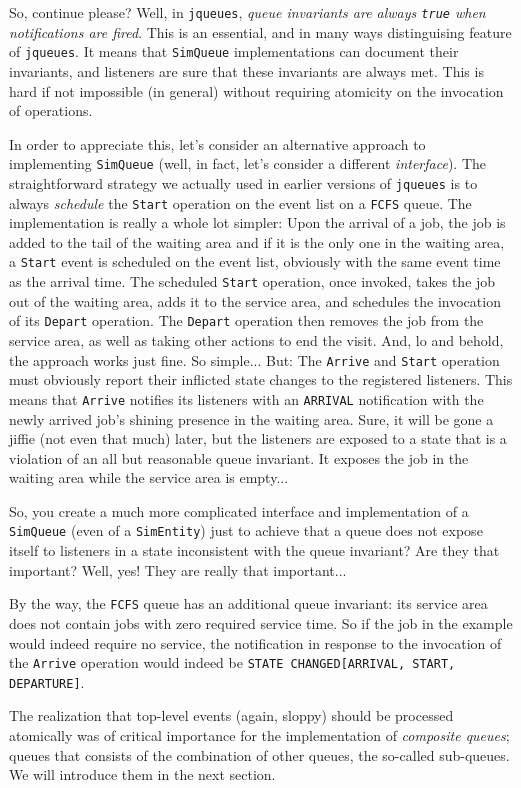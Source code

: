 So, continue please?
Well, in \lstinline|jqueues|,
  {\em queue invariants are always \lstinline|true| when notifications are fired}.
This is an essential, and in many ways distinguising feature of \lstinline|jqueues|.
It means that \lstinline|SimQueue| implementations can document
  their invariants,
  and listeners are sure that these invariants are always met.
This is hard if not impossible (in general) without requiring atomicity on
  the invocation of operations.

In order to appreciate this,
  let's consider an alternative approach to implementing \lstinline|SimQueue|
  (well, in fact, let's consider a different {\em interface\/}).
The straightforward strategy we actually used in earlier versions
  of \lstinline|jqueues| is to always {\em schedule\/}
  the \lstinline|Start| operation on the event list
  on a \lstinline|FCFS| queue.
The implementation is really a whole lot simpler:
  Upon the arrival of a job,
  the job is added to the tail of the waiting area
  and if it is the only one in the waiting area,
  a \lstinline|Start| event is scheduled on the event list,
  obviously with the same event time as the arrival time.
The scheduled \lstinline|Start| operation,
  once invoked,
  takes the job out of the waiting area,
  adds it to the service area,
  and schedules the invocation of
  its \lstinline|Depart| operation.
The \lstinline|Depart| operation then
  removes the job from the service area,
  as well as taking other actions to
  end the visit.
And, lo and behold,
  the approach works just fine.
So simple...
But: The \lstinline|Arrive| and \lstinline|Start|
  operation must obviously report
  their inflicted state changes to the registered listeners.
This means that
  \lstinline|Arrive| notifies its listeners with an \lstinline|ARRIVAL|
  notification with the newly arrived job's
  shining presence in the waiting area.
Sure,
  it will be gone a jiffie (not even that much) later,
  but the listeners are exposed to a state
  that is a violation of an all but reasonable
  queue invariant.
It exposes the job in the waiting area while
  the service area is empty...

So, you create a much more complicated interface and
  implementation of a \lstinline|SimQueue|
  (even of a \lstinline|SimEntity|)
  just to achieve that
  a queue does not expose itself to listeners
  in a state inconsistent with the queue invariant?
Are they that important?
Well, yes! They are really that important...

By the way,
  the \lstinline|FCFS| queue has an additional queue invariant:
  its service area does not contain jobs with zero
  required service time.
So if the job in the example would indeed require no
  service, the notification in response to
  the invocation of the \lstinline|Arrive| operation
  would indeed be \lstinline|STATE CHANGED[ARRIVAL, START, DEPARTURE]|.

The realization that top-level events (again, sloppy) should
  be processed atomically was of critical importance
  for the implementation of {\em composite queues\/};
  queues that consists of the combination of other
  queues, the so-called sub-queues.
We will introduce them in the next section.
